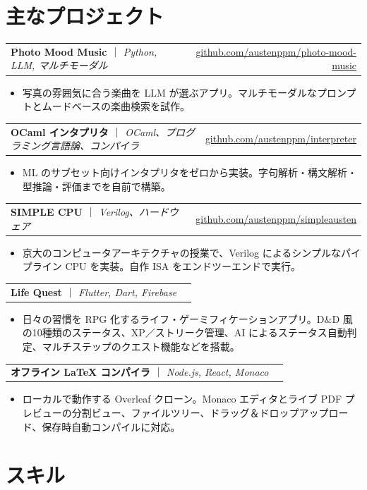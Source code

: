 \documentclass[11pt,a4paper]{article}
\makeatletter
\newcommand{\project}[4]{%
  \noindent
  \begin{tabular*}{\linewidth}{@{\extracolsep{\fill}}l r}
    \textbf{#1} \textcolor{muted}{｜} \textit{\small #2} & \href{#4}{\small\color{accent} #3}\\
  \end{tabular*}\par\vspace{-2pt}
}
\newenvironment{bullets}
  {\begin{itemize}[leftmargin=1.1em, itemsep=1pt, parsep=0pt, topsep=2pt]}
  {\end{itemize}}
\makeatother
\begin{document}
\section{主なプロジェクト}

\project{Photo Mood Music}{Python, LLM, マルチモーダル}{github.com/austenppm/photo-mood-music}{https://github.com/austenppm/photo-mood-music}
\begin{bullets}
  \item 写真の雰囲気に合う楽曲を LLM が選ぶアプリ。マルチモーダルなプロンプトとムードベースの楽曲検索を試作。
\end{bullets}

\project{OCaml インタプリタ}{OCaml、プログラミング言語論、コンパイラ}{github.com/austenppm/interpreter}{https://github.com/austenppm/interpreter}
\begin{bullets}
  \item ML のサブセット向けインタプリタをゼロから実装。字句解析・構文解析・型推論・評価までを自前で構築。
\end{bullets}

\project{SIMPLE CPU}{Verilog、ハードウェア}{github.com/austenppm/simpleausten}{https://github.com/austenppm/simpleausten}
\begin{bullets}
  \item 京大のコンピュータアーキテクチャの授業で、Verilog によるシンプルなパイプライン CPU を実装。自作 ISA をエンドツーエンドで実行。
\end{bullets}

\project{Life Quest}{Flutter, Dart, Firebase}{}{}
\begin{bullets}
  \item 日々の習慣を RPG 化するライフ・ゲーミフィケーションアプリ。D\&D 風の10種類のステータス、XP／ストリーク管理、AI によるステータス自動判定、マルチステップのクエスト機能などを搭載。
\end{bullets}

\project{オフライン LaTeX コンパイラ}{Node.js, React, Monaco}{}{}
\begin{bullets}
  \item ローカルで動作する Overleaf クローン。Monaco エディタとライブ PDF プレビューの分割ビュー、ファイルツリー、ドラッグ＆ドロップアップロード、保存時自動コンパイルに対応。
\end{bullets}

\section{スキル}
\end{document}

